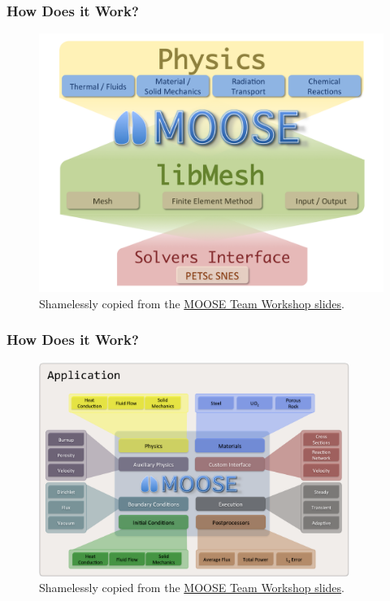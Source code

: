 \begin{frame}
        \frametitle{How Does it Work?}
  \begin{figure}
   \includegraphics[height=0.8\textheight]{./images/moose_design.png}
          \caption{Shamelessly copied from the 
          \href{https://mooseframework.inl.gov/workshop/\#/2/4}{MOOSE Team Workshop slides}.}
    \end{figure}
\end{frame}


\begin{frame}
        \frametitle{How Does it Work?}
  \begin{figure}
   \includegraphics[width=0.9\textwidth]{./images/moose_systems.png}
          \caption{Shamelessly copied from the 
          \href{https://mooseframework.inl.gov/workshop/\#/2/6}{MOOSE Team Workshop slides}.}
    \end{figure}
\end{frame}

